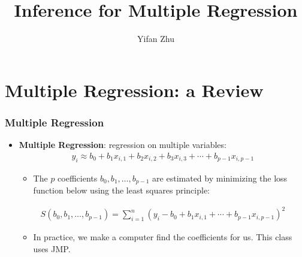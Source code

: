 \documentclass[handout]{beamer}\usepackage[]{graphicx}\usepackage[]{color}
\title{Inference for Multiple Regression}
\author{Yifan Zhu}
\date{}
\institute{Iowa State University}
\numberwithin{equation}{section}
\begin{document}
\begin{frame}
\titlepage
 \end{frame}
 

\section{Multiple Regression: a Review}

\begin{frame}
\frametitle{Multiple Regression} \small
\begin{itemize}
\item {\bf Multiple Regression}: regression on multiple variables:
\pause \begin{align*}
y_i \approx b_0 + b_1 x_{i, 1} + b_2 x_{i, 2} + b_3 x_{i,3} + \cdots + b_{p-1} x_{i, p- 1}
\end{align*}
\begin{itemize}
\pause \item The $p$ coefficients $b_0, b_1, \ldots, b_{p-1}$ are estimated by minimizing the loss function below using the least squares principle:
\end{itemize}
\pause \begin{align*}
S(b_0, b_1, \ldots, b_{p-1}) = \sum_{i = 1}^n (y_i -  b_0 + b_1 x_{i, 1} + \cdots + b_{p-1} x_{i,p- 1})^2
\end{align*}
\begin{itemize}
\pause \item In practice, we make a computer find the coefficients for us. This class uses JMP.
\end{itemize}
\end{itemize}
\end{frame}
\end{document}

